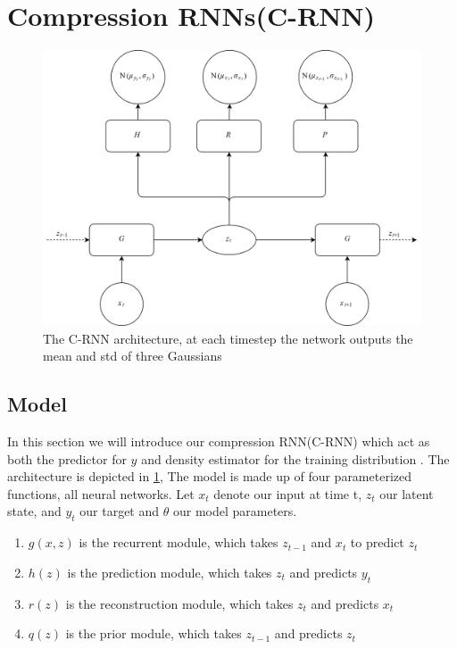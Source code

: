 \documentclass[../main.tex]{subfiles}
\begin{document}



\section{Compression RNNs(C-RNN)}
\label{sec:model}

\begin{figure}
    \centering
    \includegraphics[width=\textwidth]{Approach/rnn_architecture.png}
    \caption{The C-RNN architecture, at each timestep the network outputs the mean and std of three Gaussians}
     \label{fig:architecture}
\end{figure}


\subsection{Model}

In this section we will introduce our compression RNN(C-RNN) which act as both the predictor for $y$ and density estimator for the training distribution . 
The architecture is depicted in \cref{fig:architecture}, The model is made up of four parameterized functions, all neural networks. Let $x_t$ denote our input at time t, $z_t$ our latent state, and $y_t$ our target and $\theta$ our model parameters.
\begin{enumerate}
    \item $g(x, z)$ is the recurrent module, which takes $z_{t-1}$ and $x_t$ to predict $z_t$
    \item $h(z)$ is the prediction module, which takes $z_t$ and predicts $y_t$
    \item $r(z)$ is the reconstruction module, which takes $z_t$ and predicts $x_t$
    \item $q(z)$ is the prior module, which takes $z_{t-1}$ and predicts $z_t$
\end{enumerate}
\end{document}
